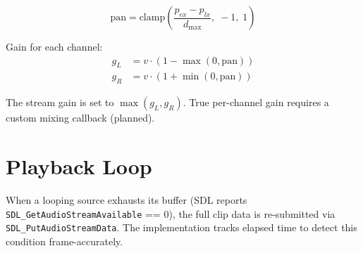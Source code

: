 \begin{equation}
\text{pan} = \text{clamp}\!\left(\frac{p_{ex} - p_{lx}}{d_\text{max}},\; -1,\; 1\right)
\end{equation}

Gain for each channel:
\begin{align}
  g_L &= v \cdot (1 - \max(0, \text{pan})) \\
  g_R &= v \cdot (1 + \min(0, \text{pan}))
\end{align}

The stream gain is set to $\max(g_L, g_R)$. True per-channel gain
requires a custom mixing callback (planned).

\section{Playback Loop}

When a looping source exhausts its buffer (SDL reports
\texttt{SDL\_GetAudioStreamAvailable} == 0), the full clip data is
re-submitted via \texttt{SDL\_PutAudioStreamData}. The implementation
tracks elapsed time to detect this condition frame-accurately.
